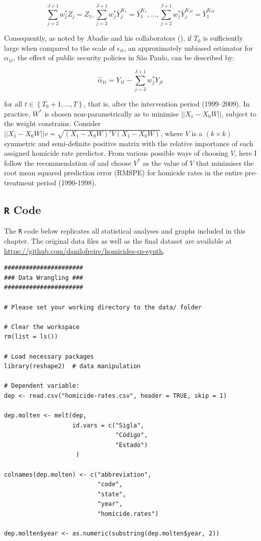 $$\sum_{j = 2}^{J + 1} w_{j}^{*} Z_{j} = Z_{1}, \sum_{j = 2}^{J + 1} w_{j}^{*}\bar{Y}_{j}^{K_{1}} = \bar{Y}_{1}^{K_{1}}, \dots, \sum_{j = 2}^{J + 1} w_{j}^{*}\bar{Y}_{j}^{K_{M}} = \bar{Y}_{1}^{K_{M}}$$ 

Consequently, as noted by Abadie and his collaborators (\citeyear{abadie2010}), if $T_{0}$ is sufficiently large when compared to the scale of $\epsilon_{it}$, an approximately unbiased estimator for $\alpha_{1t}$, the effect of public security policies in São Paulo, can be described by:

$$\hat{\alpha}_{1t} = Y_{1t} - \sum_{j = 2}^{J + 1} w_{j}^{*} Y_{jt}$$

for all $t \in \left\{T_{0} + 1, \dots, T \right\}$, that is, after the intervention period (1999--2009). In practice, $W^{*}$ is chosen non-parametrically as to minimise $||X_{1} - X_{0}W||$, subject to the weight constrains. Consider $||X_{1} - X_{0}W||v = \sqrt{(X_{1} - X_{0}W)'V (X_{1} - X_{0}W)}$, where $V$ is a $(k \times k)$ symmetric and semi-definite positive matrix with the relative importance of each assigned homicide rate predictor. From various possible ways of choosing $V$, here I follow the recommendation of \citet{abadie2003} and choose $V^{*}$ as the value of $V$ that minimises the root mean squared prediction error (RMSPE) for homicide rates in the entire pre-treatment period (1990-1998).


\subsection{\texttt{R} Code}
\label{sec:synth-code}

The \texttt{R} code below replicates all statistical analyses and graphs included in this chapter. The original data files as well as the final dataset are available at \url{https://github.com/danilofreire/homicides-sp-synth}. 

\singlespacing
\small
\begin{verbatim}
######################
### Data Wrangling ###
######################

# Please set your working directory to the data/ folder

# Clear the workspace
rm(list = ls())

# Load necessary packages
library(reshape2)  # data manipulation

# Dependent variable:
dep <- read.csv("homicide-rates.csv", header = TRUE, skip = 1)

dep.molten <- melt(dep,
                   id.vars = c("Sigla",
                               "Código",
                               "Estado")
                    )

colnames(dep.molten) <- c("abbreviation",
                          "code",
                          "state",
                          "year",
                          "homicide.rates")

dep.molten$year <- as.numeric(substring(dep.molten$year, 2))
\end{verbatim}


